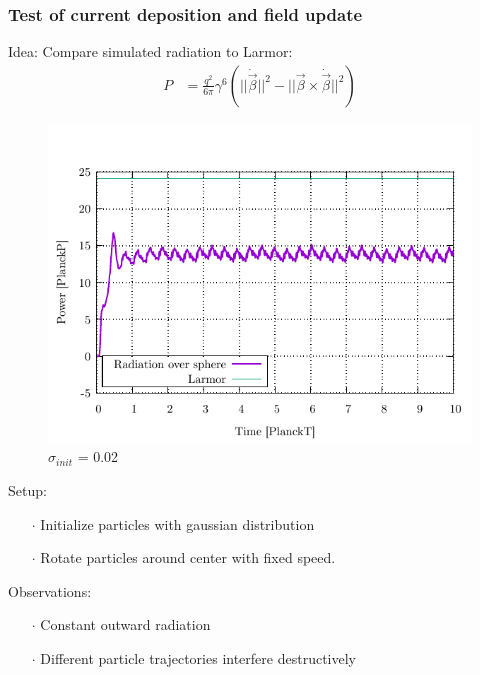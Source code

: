 \documentclass[5pt]{beamer}
\begin{document}
\begin{frame}
  
  \frametitle{Test of current deposition and field update}
  Idea: Compare simulated radiation to Larmor:
  \begin{align*}
    P &= \frac{q^2}{6\pi}\gamma^6(||\dot {\vec \beta}||^2 - ||\vec\beta \times \dot{\vec \beta}||^2)
  \end{align*}
  \begin{minipage}{0.45\textwidth}
    \centering
    \begin{figure}[h] 
      \centering
      \includegraphics[width=\columnwidth]{radplot_badres.pdf}
      \caption{$\sigma_{init}$ = 0.02}
      \label{fig:bigvar}
    \end{figure}
  \end{minipage}
  \hfill
  \begin{minipage}{0.5\textwidth}
  
  Setup:
  \begin{itemize}
    \item[$\cdot$] Initialize particles with gaussian distribution
    \item[$\cdot$] Rotate particles around center with fixed speed.
  \end{itemize} 
  \pause
  Observations:
  \begin{itemize}
    \item[$\cdot$] Constant outward radiation
    \item[$\cdot$] Different particle trajectories interfere destructively
  \end{itemize}
\end{minipage}
\end{frame}
\end{document}
